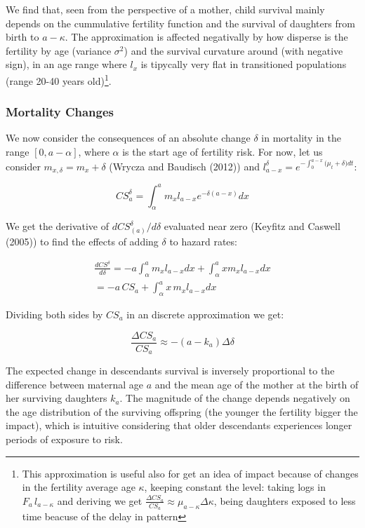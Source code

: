 \documentclass[
]{article}
\begin{document}
We find that, seen from the perspective of a mother, child survival
mainly depends on the cummulative fertility function and the survival of
daughters from birth to \(a-\kappa\). The approximation is affected
negativally by how disperse is the fertility by age (variance
\(\sigma^2\)) and the survival curvature around (with negative sign), in
an age range where \(l_x\) is tipycally very flat in transitioned
populations (range 20-40 years old)\footnote{This approximation is
  useful also for get an idea of impact because of changes in the
  fertility average age \(\kappa\), keeping constant the level: taking
  logs in \(F_a \, l_{a-\kappa}\) and deriving we get
  \(\frac{\Delta CS_a}{CS_a} \approx \mu_{a-\kappa} \Delta\kappa\),
  being daughters exposed to less time beacuse of the delay in pattern}.

\hypertarget{mortality-changes}{%
\subsubsection{Mortality Changes}\label{mortality-changes}}

We now consider the consequences of an absolute change \(\delta\) in
mortality in the range \([0,a-\alpha]\), where \(\alpha\) is the start
age of fertility risk. For now, let us consider
\(m_{x,\delta}=m_{x}+\delta\) (Wrycza and Baudisch (2012)) and
\(l_{a-x}^\delta = e^{-\int_{0}^{a-x}{(\mu_t+\delta})dt}\):

\[CS_{a}^\delta = \int_{\alpha}^{a}m_{x} l_{a-x} e^{-\delta (a-x)} dx\]

We get the derivative of \(dCS_{(a)}^\delta / d\delta\) evaluated near
zero (Keyfitz and Caswell (2005)) to find the effects of adding
\(\delta\) to hazard rates:

\[
\begin{aligned}
\frac{dCS^{\delta}}{d\delta} = -a\int_{\alpha}^{a}m_{x}{l_{a-x} dx} + \int_{\alpha}^{a} x m_{x} {l_{a-x} dx}\\
= -a \, CS_{a}  + \int_{\alpha}^{a} {x  \, m_{x} l_{a-x} dx}
\end{aligned}
\]

Dividing both sides by \(CS_{a}\) in an discrete approximation we get:

\[\frac{\Delta CS_{a}}{CS_{a}} \approx -(a - k_a) \Delta\delta\]

The expected change in descendants survival is inversely proportional to
the difference between maternal age \(a\) and the mean age of the mother
at the birth of her surviving daughters \(k_a\). The magnitude of the
change depends negatively on the age distribution of the surviving
offspring (the younger the fertility bigger the impact), which is
intuitive considering that older descendants experiences longer periods
of exposure to risk.
\end{document}
